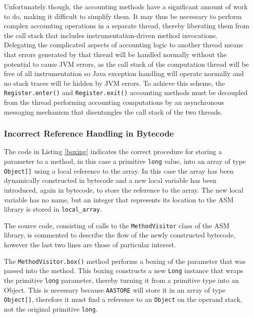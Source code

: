 \documentclass[]{final_report}
\begin{document}
Unfortunately though, the accounting methods have a significant amount of work to do, making it difficult to simplify them. It may thus be necessary to perform complex accounting operations in a separate thread, thereby liberating them from the call stack that includes instrumentation-driven method invocations. Delegating the complicated aspects of accounting logic to another thread means that errors generated by that thread will be handled normally without the potential to cause JVM errors, as the call stack of the computation thread will be free of all instrumentation so Java exception handling will operate normally and no stack traces will be hidden by JVM errors. To achieve this scheme, the \linebreak[4] \lstinline{Register.enter()} and \lstinline{Register.exit()} accounting methods must be decoupled from the thread performing accounting computations by an asynchronous messaging mechanism that disentangles the call stack of the two threads.

\subsubsection{Incorrect Reference Handling in Bytecode}

The code in Listing \ref{boxing} indicates the correct procedure for storing a parameter to a method, in this case a primitive \lstinline{long}\noop{} value, into an array of type \lstinline{Object[]}\noop{} using a local reference to the array. In this case the array has been dynamically constructed in bytecode and a new local variable has been introduced, again in bytecode, to store the reference to the array. The new local variable has no name, but an integer that represents its location to the ASM library is stored in \lstinline{local_array}.\noop{}

The source code, consisting of calls to the \lstinline{MethodVisitor}\noop{} class of the ASM library, is commented to describe the flow of the newly constructed bytecode, however the last two lines are those of particular interest.

The \lstinline{MethodVisitor.box()}\noop{} method performs a boxing of the parameter that was passed into the method. This boxing constructs a new \lstinline{Long} instance that wraps the primitive \lstinline{long} parameter, thereby turning it from a primitive type into an Object. This is necessary because \lstinline{AASTORE} will store it in an array of type \lstinline{Object[]}, therefore it must find a reference to an \lstinline{Object} on the operand stack, not the original primitive \lstinline{long}.
\end{document}

